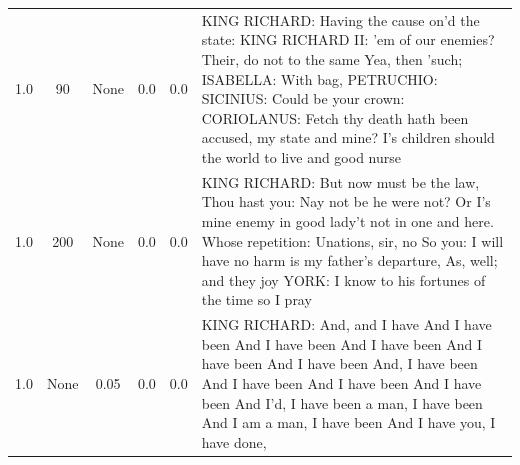 \documentclass[11pt]{book}
\begin{document}
\begin{longtable}{ccccc p{12cm}}
    1.0 & 90 & None & 0.0 & 0.0 &
    KING RICHARD:\newline
    Having the cause on'd the state:\newline
    KING RICHARD II:\newline
    'em of our enemies?\newline
    Their, do not to the same\newline
    Yea, then 'such;\newline
    ISABELLA:\newline
    With bag,\newline
    PETRUCHIO:\newline
    SICINIUS:\newline
    Could be your crown:\newline
    CORIOLANUS:\newline
    Fetch thy death hath been accused, my state and mine?\newline
    I's children should the world to live and good nurse\\
    
    1.0 & 200 & None & 0.0 & 0.0 &
    KING RICHARD:\newline
    But now must be the law,\newline
    Thou hast you:\newline
    Nay not be he were not?\newline
    Or I's mine enemy in good lady't not in one and here.\newline
    Whose repetition:\newline
    Unations, sir, no\newline
    So you: I will have no harm is my father's departure,\newline
    As, well; and they joy\newline
    YORK:\newline
    I know to his fortunes of the time so I pray\\
    
    1.0 & None & 0.05 & 0.0 & 0.0 &
    KING RICHARD:\newline
    And, and I have\newline
    And I have been\newline
    And I have been\newline
    And I have been\newline
    And I have been\newline
    And I have been\newline
    And, I have been\newline
    And I have been\newline
    And I have been\newline
    And I have been\newline
    And I'd, I have been a man, I have been\newline
    And I am a man, I have been\newline
    And I have you, I have done,\\
    

\end{longtable}
\end{document}
